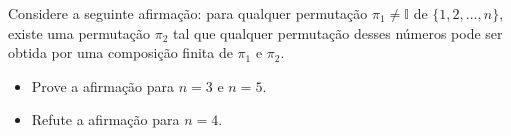 Considere a seguinte afirmação: para qualquer permutação \(\pi_1\not=\mathbb{I}\) de \(\{1,2,\dots,n\}\), existe uma permutação \(\pi_2\) tal que qualquer permutação desses números pode ser obtida por uma composição finita de \(\pi_1\) e \(\pi_2\).
\begin{itemize}

\item[(a)] Prove a afirmação para \(n=3\) e \(n=5\).
\item[(b)] Refute a afirmação para \(n=4\).
\end{itemize}
